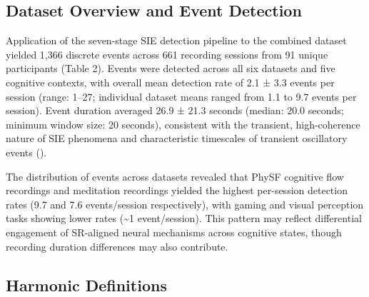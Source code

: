 \documentclass[11pt,a4paper]{article}
\begin{document}
\subsection{Dataset Overview and Event Detection}
Application of the seven-stage SIE detection pipeline to the combined dataset yielded 1,366 discrete events across 661 recording sessions from 91 unique participants (Table 2). Events were detected across all six datasets and five cognitive contexts, with overall mean detection rate of 2.1 ± 3.3 events per session (range: 1–27; individual dataset means ranged from 1.1 to 9.7 events per session). Event duration averaged 26.9 ± 21.3 seconds (median: 20.0 seconds; minimum window size: 20 seconds), consistent with the transient, high-coherence nature of SIE phenomena and characteristic timescales of transient oscillatory events (\cite{siegel2012spectral}).
\begin{table}[H]
    \centering
     \end{table}
The distribution of events across datasets revealed that PhySF cognitive flow recordings and meditation recordings yielded the highest per-session detection rates (9.7 and 7.6 events/session respectively), with gaming and visual perception tasks showing lower rates (\textasciitilde{}1 event/session). This pattern may reflect differential engagement of SR-aligned neural mechanisms across cognitive states, though recording duration differences may also contribute.

\subsection{Harmonic Definitions}
\end{document}
